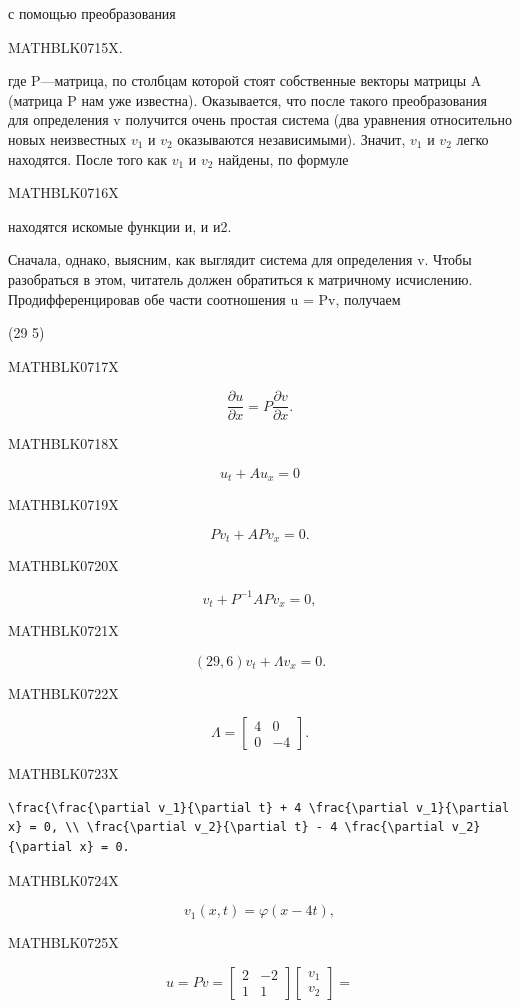 \documentclass[
  ukrainian,
]{article}
\begin{document}
с помощью преобразования

MATHBLK0715X.

где P---матрица, по столбцам которой стоят собственные векторы матрицы A
(матрица P нам уже известна). Оказывается, что после такого
преобразования для определения v получится очень простая система (два
уравнения относительно новых неизвестных \(v_1\) и \(v_2\) оказываются
независимыми). Значит, \(v_1\) и \(v_2\) легко находятся. После того как
\(v_1\) и \(v_2\) найдены, по формуле

MATHBLK0716X

находятся искомые функции и, и и2.

Сначала, однако, выясним, как выглядит система для определения v. Чтобы
разобраться в этом, читатель должен обратиться к матричному исчислению.
Продифференцировав обе части соотношения u = Pv, получаем

(29 5)

MATHBLK0717X

\[
\frac{\partial u}{\partial x} = P \frac{\partial v}{\partial x}.
\]

MATHBLK0718X

\[
u_t + Au_x = 0
\]

MATHBLK0719X

\[
Pv_t + APv_x = 0.
\]

MATHBLK0720X

\[
v_t + P^{-1}APv_x = 0,
\]

MATHBLK0721X

\[
(29,6) v_t + \Lambda v_x = 0.
\]

MATHBLK0722X

\[
\Lambda = \begin{bmatrix} 4 & 0 \\ 0 & -4 \end{bmatrix}.
\]

MATHBLK0723X

\begin{verbatim}
\frac{\frac{\partial v_1}{\partial t} + 4 \frac{\partial v_1}{\partial x} = 0, \\ \frac{\partial v_2}{\partial t} - 4 \frac{\partial v_2}{\partial x} = 0.
\end{verbatim}

MATHBLK0724X

\[
v_1(x, t) = \varphi(x-4t),
\]

MATHBLK0725X

\[
u = Pv = \begin{bmatrix} 2 & -2 \\ 1 & 1 \end{bmatrix} \begin{bmatrix} v_1 \\ v_2 \end{bmatrix} =
\]
\end{document}
